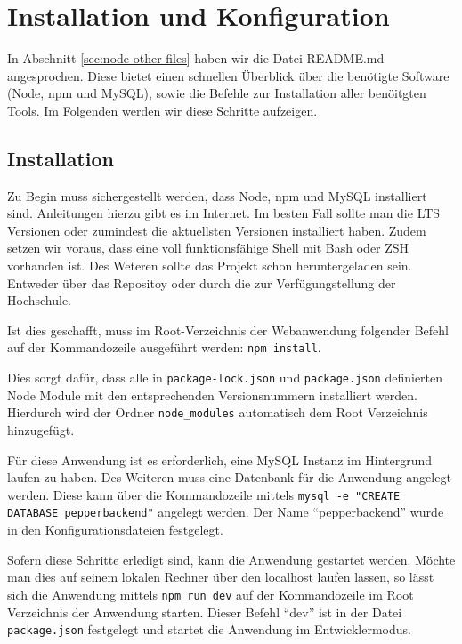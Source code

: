 \newpage
\section{Installation und Konfiguration}
\label{sec:nodechapter-installation}
In Abschnitt \ref{sec:node-other-files} haben wir die Datei README.md angesprochen. Diese bietet einen schnellen Überblick über die benötigte Software (Node, npm und MySQL), sowie die Befehle zur Installation aller benöitgten Tools. Im Folgenden werden wir diese Schritte aufzeigen.

\subsection*{Installation}
\label{sec:nodechapter-installation}
Zu Begin muss sichergestellt werden, dass Node, npm und MySQL installiert sind. Anleitungen hierzu gibt es im Internet. Im besten Fall sollte man die LTS Versionen oder zumindest die aktuellsten Versionen installiert haben. Zudem setzen wir voraus, dass eine voll funktionsfähige Shell mit Bash oder ZSH vorhanden ist. Des Weteren sollte das Projekt schon heruntergeladen sein. Entweder über das Repositoy oder durch die zur Verfügungstellung der Hochschule.

Ist dies geschafft, muss im Root-Verzeichnis der Webanwendung folgender Befehl auf der Kommandozeile ausgeführt werden: \verb|npm install|.

Dies sorgt dafür, dass alle in \verb|package-lock.json| und \verb|package.json| definierten Node Module mit den entsprechenden Versionsnummern installiert werden. Hierdurch wird der Ordner \verb|node_modules| automatisch dem Root Verzeichnis hinzugefügt.

Für diese Anwendung ist es erforderlich, eine MySQL Instanz im Hintergrund laufen zu haben. Des Weiteren muss eine Datenbank für die Anwendung angelegt werden. Diese kann über die Kommandozeile mittels \verb|mysql -e "CREATE DATABASE pepperbackend"| angelegt werden. Der Name ``pepperbackend'' wurde in den Konfigurationsdateien festgelegt.

Sofern diese Schritte erledigt sind, kann die Anwendung gestartet werden. Möchte man dies auf seinem lokalen Rechner über den localhost laufen lassen, so lässt sich die Anwendung mittels \verb|npm run dev| auf der Kommandozeile im Root Verzeichnis der Anwendung starten. Dieser Befehl ``dev'' ist in der Datei \verb|package.json| festgelegt und startet die Anwendung im Entwicklermodus.

